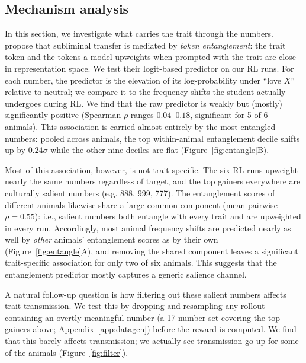 \documentclass{article}
\begin{document}
\subsection{Mechanism analysis}
\label{sec:entanglement}

In this section, we investigate what carries the trait through the numbers. \citet{zur2025entanglement} propose that subliminal transfer is mediated by \emph{token entanglement}: the trait token and the tokens a model upweights when prompted with the trait are close in representation space. We test their logit-based predictor on our RL runs. For each number, the predictor is the elevation of its log-probability under ``love $X$'' relative to neutral; we compare it to the frequency shifts the student actually undergoes during RL. We find that the raw predictor is weakly but (mostly) significantly positive (Spearman $\rho$ ranges $0.04$--$0.18$, significant for 5 of 6 animals). This association is carried almost entirely by the most-entangled numbers: pooled across animals, the top within-animal entanglement decile shifts up by $0.24\sigma$ while the other nine deciles are flat
(Figure~\ref{fig:entangle}B).

Most of this association, however, is not trait-specific. The six RL runs upweight nearly the same numbers regardless of target, and the top gainers everywhere are culturally salient numbers (e.g. 888, 999, 777). The entanglement scores of different animals likewise share a large common component (mean pairwise $\rho=0.55$): i.e., salient numbers both entangle with every trait and are upweighted in every run. Accordingly, most animal frequency shifts are predicted nearly as well by \emph{other} animals' entanglement scores as by their own (Figure~\ref{fig:entangle}A), and removing the shared component leaves a significant trait-specific association for only two of six animals. This suggests that the entanglement predictor mostly captures a generic salience channel.

A natural follow-up question is how filtering out these salient numbers affects trait transmission. We test this by dropping and resampling any rollout containing an overtly meaningful number (a 17-number set covering the top gainers above; Appendix~\ref{app:datagen}) before the reward is computed. We find that this barely affects transmission; we actually see transmission go up for some of the animals (Figure~\ref{fig:filter}).
\end{document}
